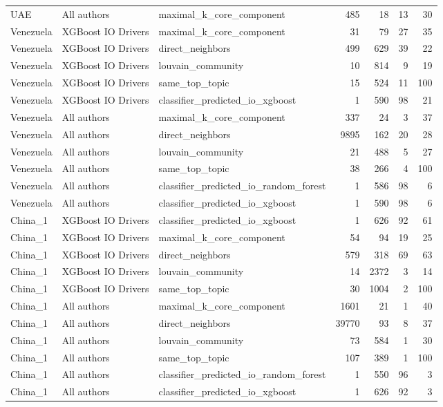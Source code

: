 \begin{tabular}{lllrrrr}
UAE & All authors & maximal\_k\_core\_component & 485 & 18 & 13 & 30 \\
Venezuela & XGBoost IO Drivers & maximal\_k\_core\_component & 31 & 79 & 27 & 35 \\
Venezuela & XGBoost IO Drivers & direct\_neighbors & 499 & 629 & 39 & 22 \\
Venezuela & XGBoost IO Drivers & louvain\_community & 10 & 814 & 9 & 19 \\
Venezuela & XGBoost IO Drivers & same\_top\_topic & 15 & 524 & 11 & 100 \\
Venezuela & XGBoost IO Drivers & classifier\_predicted\_io\_xgboost & 1 & 590 & 98 & 21 \\
Venezuela & All authors & maximal\_k\_core\_component & 337 & 24 & 3 & 37 \\
Venezuela & All authors & direct\_neighbors & 9895 & 162 & 20 & 28 \\
Venezuela & All authors & louvain\_community & 21 & 488 & 5 & 27 \\
Venezuela & All authors & same\_top\_topic & 38 & 266 & 4 & 100 \\
Venezuela & All authors & classifier\_predicted\_io\_random\_forest & 1 & 586 & 98 & 6 \\
Venezuela & All authors & classifier\_predicted\_io\_xgboost & 1 & 590 & 98 & 6 \\
China\_1 & XGBoost IO Drivers & classifier\_predicted\_io\_xgboost & 1 & 626 & 92 & 61 \\
China\_1 & XGBoost IO Drivers & maximal\_k\_core\_component & 54 & 94 & 19 & 25 \\
China\_1 & XGBoost IO Drivers & direct\_neighbors & 579 & 318 & 69 & 63 \\
China\_1 & XGBoost IO Drivers & louvain\_community & 14 & 2372 & 3 & 14 \\
China\_1 & XGBoost IO Drivers & same\_top\_topic & 30 & 1004 & 2 & 100 \\
China\_1 & All authors & maximal\_k\_core\_component & 1601 & 21 & 1 & 40 \\
China\_1 & All authors & direct\_neighbors & 39770 & 93 & 8 & 37 \\
China\_1 & All authors & louvain\_community & 73 & 584 & 1 & 30 \\
China\_1 & All authors & same\_top\_topic & 107 & 389 & 1 & 100 \\
China\_1 & All authors & classifier\_predicted\_io\_random\_forest & 1 & 550 & 96 & 3 \\
China\_1 & All authors & classifier\_predicted\_io\_xgboost & 1 & 626 & 92 & 3 \\

\end{tabular}
